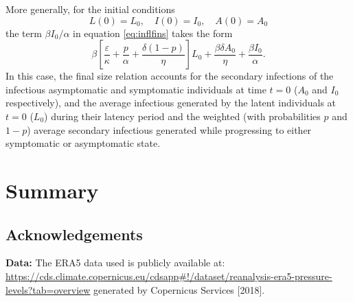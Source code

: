 \documentclass{book}\usepackage[]{graphicx}\usepackage[]{color}
\begin{document}
More generally, for the initial conditions
$$
L(0)=L_{0}, \quad I(0)=I_{0}, \quad A(0)=A_{0}
$$
the term $\beta I_{0} / \alpha$ in equation \eqref{eq:inflfins} takes the form
$$
\beta\left[\frac{\varepsilon}{\kappa}+\frac{p}{\alpha}+\frac{\delta(1-p)}{\eta}\right] L_{0}+\frac{\beta \delta A_{0}}{\eta}+\frac{\beta I_{0}}{\alpha}.
$$
In this case, the final size relation accounts for the secondary infections of the infectious asymptomatic and symptomatic individuals at time $t=0$ ($A_0$ and $I_0$ respectively), and the average infectious generated by the latent individuals at $t=0$ ($L_0$) during their latency period and the weighted (with probabilities $p$ and $1-p$) average secondary infectious generated while progressing to either symptomatic or asymptomatic state.

\chapter*{Summary}
\label{chapt:summary}





\section{Acknowledgements}
\textbf{Data:} The ERA5 data used is publicly available at: \url{https://cds.climate.copernicus.eu/cdsapp#!/dataset/reanalysis-era5-pressure-levels?tab=overview} generated by Copernicus Services [2018].
\end{document}
